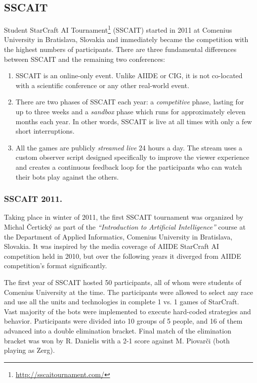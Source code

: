 \documentclass{llncs}
\begin{document}
\subsection{SSCAIT}\label{sec:SSCAIT}
Student StarCraft AI Tournament\footnote{\url{http://sscaitournament.com/}} (SSCAIT) started in 2011 at Comenius University in Bratislava, Slovakia and immediately became the competition with the highest numbers of participants.
There are three fundamental differences between SSCAIT and the remaining two conferences:
\begin{enumerate}
  \item SSCAIT is an online-only event. Unlike AIIDE or CIG, it is not co-located with a scientific conference or any other real-world event.
  \item There are two phases of SSCAIT each year: a {\em competitive} phase, lasting for up to three weeks and a {\em sandbox} phase which runs for approximately eleven months each year. In other words, SSCAIT is live at all times with only a few short interruptions.
  \item All the games are publicly {\em streamed live} 24 hours a day. The stream uses a custom observer script \cite{mattsson2015automatic} designed specifically to improve the viewer experience and creates a continuous feedback loop for the participants who can watch their bots play against the others.
\end{enumerate}

\subsubsection{SSCAIT 2011.}
Taking place in winter of 2011, the first SSCAIT tournament was organized by Michal \v{C}ertick\'{y} as part of the {\em ``Introduction to Artificial Intelligence''} course at the Department of Applied Informatics, Comenius University in Bratislava, Slovakia. It was inspired by the media coverage of AIIDE StarCraft AI competition held in 2010, but over the following years it diverged from AIIDE competition's format significantly.

The first year of SSCAIT hosted 50 participants, all of whom were students of Comenius University at the time. The participants were allowed to select any race and use all the units and technologies in complete 1 vs. 1 games of StarCraft. Vast majority of the bots were implemented to execute hard-coded strategies and behavior. Participants were divided into 10 groups of 5 people, and 16 of them advanced into a double elimination bracket. Final match of the elimination bracket was won by R. Danielis with a 2-1 score against M. Piovar\v{c}i (both playing as Zerg).
\end{document}
